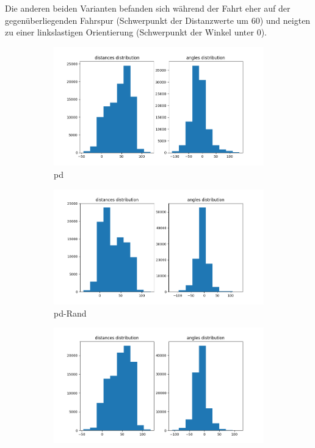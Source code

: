 Die anderen beiden Varianten befanden sich während der Fahrt eher auf der gegenüberliegenden Fahrspur (Schwerpunkt der Distanzwerte um 60) und neigten zu einer linkslastigen Orientierung (Schwerpunkt der Winkel unter 0).

\begin{figure}[H]
	\centering
	\begin{subfigure}[h]{0.5\textwidth}
		\centering
		\includegraphics[width=\linewidth]{kapitel5/images/eval/single-loss/pd-distr.png}
		\caption{\glqq\acs{pd}\grqq}
		\label{2d-pd-val-distr}
	\end{subfigure}%
	\begin{subfigure}[h]{0.5\textwidth}
		\centering
		\includegraphics[width=\linewidth]{kapitel5/images/eval/single-loss/pd-rand-distr.png}
		\caption{\glqq\acs{pd}-Rand\grqq}
		\label{2d-pd-rand-val-distr}
	\end{subfigure}
	\begin{subfigure}[h]{0.5\textwidth}
		\centering
		\includegraphics[width=\linewidth]{kapitel5/images/eval/single-loss/pd-concat-distr.png}

\end{subfigure}
\end{figure}
